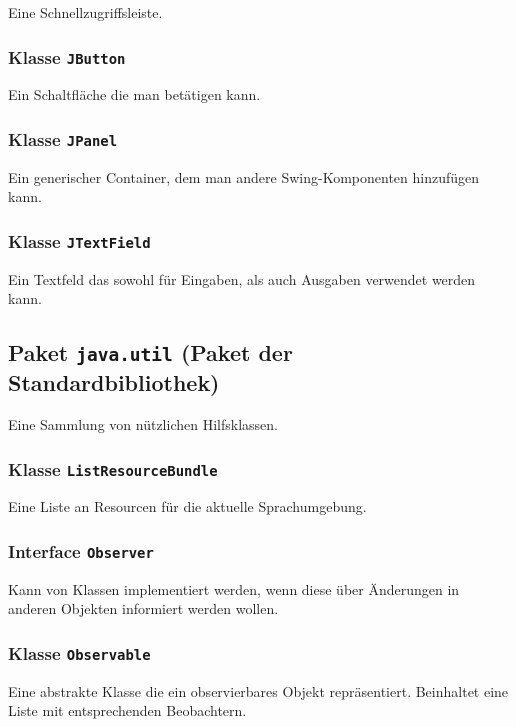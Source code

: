 \documentclass[parskip=full,11pt,twoside]{scrartcl}
\begin{document}
Eine Schnellzugriffsleiste.

\subsubsection{Klasse \texttt{JButton}}

Ein Schaltfläche die man betätigen kann.

\subsubsection{Klasse \texttt{JPanel}}

Ein generischer Container, dem man andere Swing-Komponenten hinzufügen kann.

\subsubsection{Klasse \texttt{JTextField}}

Ein Textfeld das sowohl für Eingaben, als auch Ausgaben verwendet werden kann.

\subsection{Paket \texttt{java.util} (Paket der Standardbibliothek)}

Eine Sammlung von nützlichen Hilfsklassen.

\subsubsection{Klasse \texttt{ListResourceBundle}}

Eine Liste an Resourcen für die aktuelle Sprachumgebung.

\subsubsection{Interface \texttt{Observer}}

Kann von Klassen implementiert werden, wenn diese über Änderungen in anderen Objekten informiert werden wollen.

\subsubsection{Klasse \texttt{Observable}}

Eine abstrakte Klasse die ein observierbares Objekt repräsentiert. Beinhaltet eine Liste mit entsprechenden Beobachtern.
\end{document}
